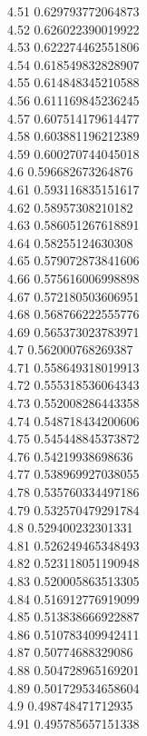 {4.51	0.629793772064873\\
4.52	0.626022390019922\\
4.53	0.622274462551806\\
4.54	0.618549832828907\\
4.55	0.614848345210588\\
4.56	0.611169845236245\\
4.57	0.607514179614477\\
4.58	0.603881196212389\\
4.59	0.600270744045018\\
4.6	0.596682673264876\\
4.61	0.593116835151617\\
4.62	0.58957308210182\\
4.63	0.586051267618891\\
4.64	0.58255124630308\\
4.65	0.579072873841606\\
4.66	0.575616006998898\\
4.67	0.572180503606951\\
4.68	0.568766222555776\\
4.69	0.565373023783971\\
4.7	0.562000768269387\\
4.71	0.558649318019913\\
4.72	0.555318536064343\\
4.73	0.552008286443358\\
4.74	0.548718434200606\\
4.75	0.545448845373872\\
4.76	0.54219938698636\\
4.77	0.538969927038055\\
4.78	0.535760334497186\\
4.79	0.532570479291784\\
4.8	0.529400232301331\\
4.81	0.526249465348493\\
4.82	0.523118051190948\\
4.83	0.520005863513305\\
4.84	0.516912776919099\\
4.85	0.513838666922887\\
4.86	0.510783409942411\\
4.87	0.50774688329086\\
4.88	0.504728965169201\\
4.89	0.501729534658604\\
4.9	0.498748471712935\\
4.91	0.495785657151338\\
}
